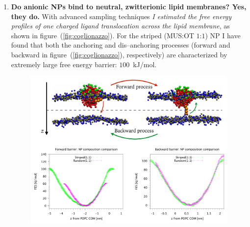 
\begin{enumerate}[label=\itshape\roman*.,listparindent=1em]
	\item \textbf{\textsf{Do anionic \acp{NP} bind to neutral, zwitterionic lipid membranes? Yes, they do.}} With advanced sampling techniques \textit{I estimated the free energy profiles of one charged ligand translocation across the lipid membrane}, as shown in figure~(\ref{fig:coglionazzo}).
	For the striped (\acs{MUS}:\acs{OT} $1$:$1$) \ac{NP} I have found that both the anchoring and dis--anchoring processes (forward and backward in figure~(\ref{fig:coglionazzo}), respectively) are characterized by extremely large free energy barrier: $100$~kJ/mol.
\begin{figure}[ht]
	\center
	\includegraphics[width=1\textwidth]{./img/coglionazzo}

\end{figure}
\end{enumerate}
